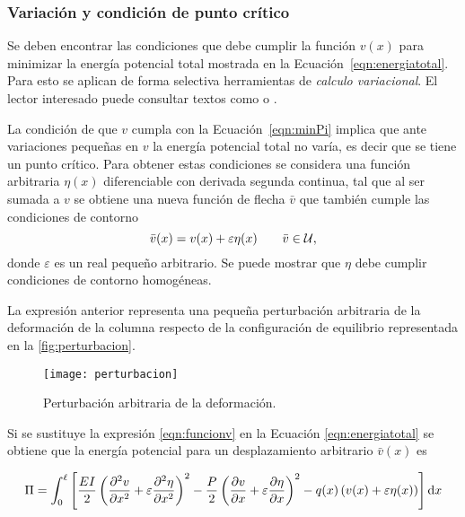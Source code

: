 \subsubsection{Variación y condición de punto crítico}

Se deben encontrar las condiciones que debe cumplir la función $v(x)$ para minimizar la energía potencial total mostrada en la Ecuación~\ref{eqn:energiatotal}. %
%
Para esto se aplican de forma selectiva herramientas de \textit{calculo variacional}. El lector interesado puede consultar textos como \citep{Reddy2002b} o \citep{Taroco2019}.

La condición de que $v$ cumpla con la Ecuación~\ref{eqn:minPi} implica que ante variaciones pequeñas en $v$ la energía potencial total no varía, es decir que se tiene un punto crítico. %
%
Para obtener estas condiciones se considera una función arbitraria $\eta(x)$ diferenciable con derivada segunda continua, tal que al ser sumada a $v$ se obtiene una nueva función de flecha $\bar{v}$ que también cumple las condiciones de contorno
%
\begin{equation}\label{eqn:funcionv}
\bar{v}(x)=v(x)+\varepsilon\eta(x) \qquad \bar{v}\in {\mathcal U},
\end{equation}
donde $\varepsilon$ es un real pequeño arbitrario. %
%
Se puede mostrar que $\eta$ debe cumplir condiciones de contorno homogéneas.

La expresión anterior representa una pequeña perturbación arbitraria de la deformación de la columna respecto de la configuración de equilibrio representada en la \autoref{fig:perturbacion}.
%
\begin{figure}[htb]
	\centering
	\texttt{[image: perturbacion]}
	\caption{Perturbación arbitraria de la deformación.}
	\label{fig:perturbacion}
\end{figure}

Si se sustituye la expresión \eqref{eqn:funcionv} en la Ecuación \eqref{eqn:energiatotal} se obtiene que la energía potencial para un desplazamiento arbitrario $\bar{v}(x)$ es

\begin{equation}\label{eqn:energiatotal2}
\Pi = \int_0^\ell \left[ \frac{EI}{2} \left( \frac{\partial^2 v}{\partial x^2} + \varepsilon\frac{\partial^2 \eta}{\partial x^2} \right)^2 - \frac{P}{2} \left(\frac{\partial v}{\partial x} + \varepsilon\frac{\partial \eta}{\partial x}\right)^2- q(x) \left( v(x)+\varepsilon\eta(x)\right) \right] {\text{d}} x
\end{equation}

